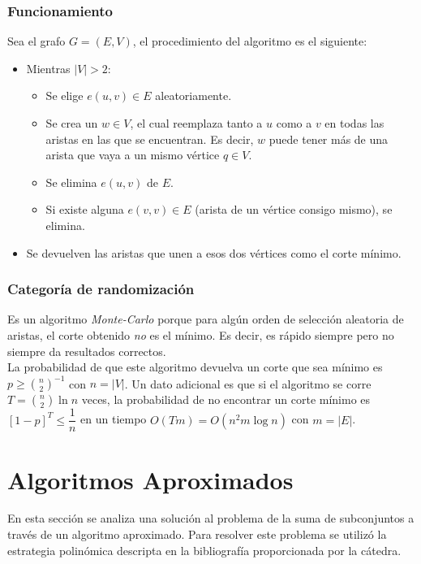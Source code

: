 \documentclass[a4paper, 10pt]{article}
\newcommand\tab[1][0.5cm]{\hspace*{#1}}
\begin{document}
            \subsubsection{Funcionamiento}
                Sea el grafo $G = (E, V)$, el procedimiento del algoritmo es el siguiente:
                \begin{itemize}
                    \item Mientras $|V| > 2$:
                    \begin{itemize}
                        \item Se elige $e(u, v) \in E$ aleatoriamente.
                        \item Se crea un $w \in V$, el cual reemplaza tanto a $u$ como a $v$ en todas
                        las aristas en las que se encuentran. Es decir, $w$ puede tener más de una arista
                        que vaya a un mismo vértice $q \in V$.
                        \item Se elimina $e(u, v)$ de $E$.
                        \item Si existe alguna $e(v, v) \in E$ (arista de un vértice consigo mismo), se elimina.
                    \end{itemize}
                    \item Se devuelven las aristas que unen a esos dos vértices como el corte mínimo.
                \end{itemize}
            \subsubsection{Categoría de randomización}
                    Es un algoritmo \emph{Monte-Carlo} porque para algún orden de selección aleatoria
                de aristas, el corte obtenido \emph{no} es el mínimo. Es decir, es rápido siempre pero no siempre
                da resultados correctos. \\
                \tab La probabilidad de que este algoritmo devuelva un corte que sea mínimo es $p \geqslant \binom{n}{2}^{-1}$
                con $n = |V|$. Un dato adicional es que si el algoritmo se corre $T = \binom{n}{2}\ln{n}$ veces,
                la probabilidad de no encontrar un corte mínimo es $[1-p]^T \leqslant \dfrac{1}{n}$ en un tiempo
                $O(Tm) = O(n^2m\log{n})$ con $m = |E|$.
    \newpage

    \section{Algoritmos Aproximados}
        \tab En esta sección se analiza una solución al problema de la suma de subconjuntos
        a través de un algoritmo aproximado. Para resolver este problema se utilizó la 
        estrategia polinómica descripta en la bibliografía proporcionada por la cátedra.
\end{document}
